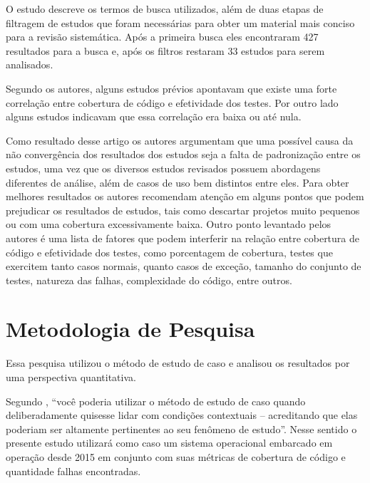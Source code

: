 \documentclass[11.5pt]{article}
\begin{document}
O estudo descreve os termos de busca utilizados, além de duas etapas de filtragem de estudos que
foram necessárias para obter um material mais conciso para a revisão sistemática.
Após a primeira busca eles encontraram 427 resultados para a busca e, após os filtros restaram 33
estudos para serem analisados.

Segundo os autores, alguns estudos prévios apontavam que existe uma forte correlação entre cobertura
de código e efetividade dos testes.
Por outro lado alguns estudos indicavam que essa correlação era baixa ou até nula.

Como resultado desse artigo os autores argumentam que uma possível causa da não convergência dos
resultados dos estudos seja a falta de padronização entre os estudos, uma vez que os diversos
estudos revisados possuem abordagens diferentes de análise, além de casos de uso bem distintos entre
eles.
Para obter melhores resultados os autores recomendam atenção em alguns pontos que podem prejudicar
os resultados de estudos, tais como descartar projetos muito pequenos ou com uma cobertura
excessivamente baixa.
Outro ponto levantado pelos autores é uma lista de fatores que podem interferir na relação entre
cobertura de código e efetividade dos testes, como porcentagem de cobertura, testes que exercitem
tanto casos normais, quanto casos de exceção, tamanho do conjunto de testes, natureza das falhas,
complexidade do código, entre outros.




\section{Metodologia de Pesquisa}

Essa pesquisa utilizou o método de estudo de caso e analisou os resultados por uma perspectiva
quantitativa.

Segundo \cite{estudoDeCasoYin}, ``você poderia utilizar o método de estudo de caso quando
deliberadamente quisesse lidar com condições contextuais -- acreditando que elas poderiam ser
altamente pertinentes ao seu fenômeno de estudo''.
Nesse sentido o presente estudo utilizará como caso um sistema operacional embarcado em operação
desde 2015 em conjunto com suas métricas de cobertura de código e quantidade falhas encontradas.
\end{document}
